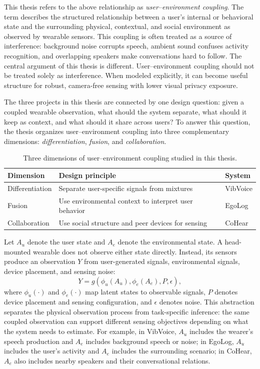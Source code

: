 This thesis refers to the above relationship as \textit{user--environment coupling}. The term describes the structured relationship between a user's internal or behavioral state and the surrounding physical, contextual, and social environment as observed by wearable sensors. This coupling is often treated as a source of interference: background noise corrupts speech, ambient sound confuses activity recognition, and overlapping speakers make conversations hard to follow. The central argument of this thesis is different. User--environment coupling should not be treated solely as interference. When modeled explicitly, it can become useful structure for robust, camera-free sensing with lower visual privacy exposure.

The three projects in this thesis are connected by one design question: given a coupled wearable observation, what should the system separate, what should it keep as context, and what should it share across users? To answer this question, the thesis organizes user--environment coupling into three complementary dimensions: \textit{differentiation}, \textit{fusion}, and \textit{collaboration}.

\begin{table}[t]
    \centering
    \caption{Three dimensions of user--environment coupling studied in this thesis.}
    \label{tab:coupling_dimensions}
    \begin{tabular}{lll}
        \toprule
        Dimension & Design principle & System \\
        \midrule
        Differentiation & Separate user-specific signals from mixtures & VibVoice \\
        Fusion & Use environmental context to interpret user behavior & EgoLog \\
        Collaboration & Use social structure and peer devices for sensing & CoHear \\
        \bottomrule
    \end{tabular}
\end{table}

Let $A_u$ denote the user state and $A_e$ denote the environmental state. A head-mounted wearable does not observe either state directly. Instead, its sensors produce an observation $Y$ from user-generated signals, environmental signals, device placement, and sensing noise:
\[
Y = g(\phi_u(A_u), \phi_e(A_e), P, \epsilon),
\]
where $\phi_u(\cdot)$ and $\phi_e(\cdot)$ map latent states to observable signals, $P$ denotes device placement and sensing configuration, and $\epsilon$ denotes noise. This abstraction separates the physical observation process from task-specific inference: the same coupled observation can support different sensing objectives depending on what the system needs to estimate.
For example, in VibVoice, $A_u$ includes the wearer's speech production and $A_e$ includes background speech or noise; in EgoLog, $A_u$ includes the user's activity and $A_e$ includes the surrounding scenario; in CoHear, $A_e$ also includes nearby speakers and their conversational relations.

